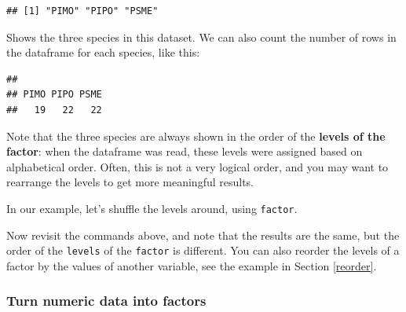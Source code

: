 \documentclass[]{book}
\newenvironment{Shaded}{\begin{snugshade}}{\end{snugshade}}
\newcommand{\DataTypeTok}[1]{\textcolor[rgb]{0.13,0.29,0.53}{#1}}
\newcommand{\KeywordTok}[1]{\textcolor[rgb]{0.13,0.29,0.53}{\textbf{#1}}}
\newcommand{\NormalTok}[1]{#1}
\newcommand{\OperatorTok}[1]{\textcolor[rgb]{0.81,0.36,0.00}{\textbf{#1}}}
\newcommand{\StringTok}[1]{\textcolor[rgb]{0.31,0.60,0.02}{#1}}
\begin{document}
\begin{Shaded}
\end{Shaded}

\begin{verbatim}
## [1] "PIMO" "PIPO" "PSME"
\end{verbatim}

Shows the three species in this dataset. We can also count the number of rows in the dataframe for each species, like this:

\begin{Shaded}
\end{Shaded}

\begin{verbatim}
## 
## PIMO PIPO PSME 
##   19   22   22
\end{verbatim}

Note that the three species are always shown in the order of the \textbf{levels of the factor}: when the dataframe was read, these levels were assigned based on alphabetical order. Often, this is not a very logical order, and you may want to rearrange the levels to get more meaningful results.

In our example, let's shuffle the levels around, using \texttt{factor}.

\begin{Shaded}
\end{Shaded}

Now revisit the commands above, and note that the results are the same, but the order of the \texttt{levels} of
the \texttt{factor} is different. You can also reorder the levels of a factor by the values of another variable, see the example in Section \ref{reorder}.

\hypertarget{turn-numeric-data-into-factors}{%
\subsubsection{Turn numeric data into factors}\label{turn-numeric-data-into-factors}}
\end{document}
